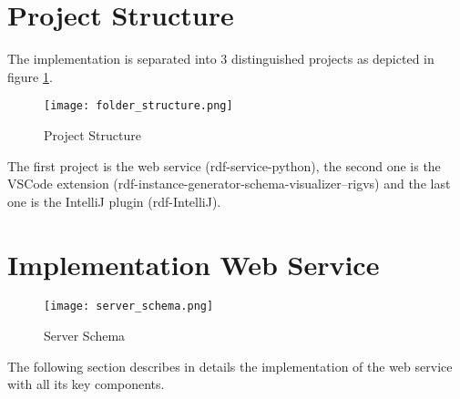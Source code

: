 \section{Project Structure\label{sec:projectstructure}}

The implementation is separated into 3 distinguished projects as depicted in figure \ref{fig:projectstructure}.

\begin{figure}[htb]
  \centering
  \texttt{[image: folder\_structure.png]}
  \caption{Project Structure}
  \label{fig:projectstructure}
\end{figure}

The first project is the web service (rdf-service-python), the second one is the VSCode extension (rdf-instance-generator-schema-visualizer--rigvs) and the last one is the IntelliJ plugin (rdf-IntelliJ).

\section{Implementation Web Service\label{sec:webservice}}

\begin{figure}[htb]
	\centering
	\texttt{[image: server\_schema.png]}
	\caption{Server Schema}
	\label{fig:serverschema}
  \end{figure}


\noindent
The following section describes in details the implementation of the web service with all its key components.
\\
\\
